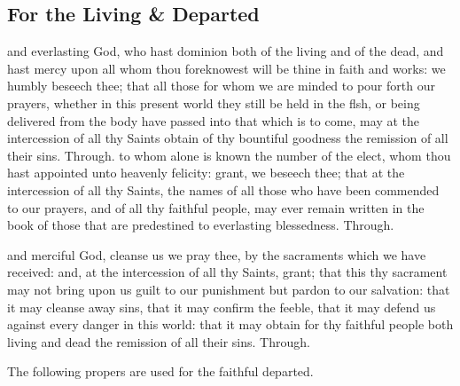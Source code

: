 \begin{multicols}{2}
\subsection{For the Living \& Departed}
\collect
{} and everlasting God, who hast dominion both of the living and of the dead, and hast mercy upon all whom thou foreknowest will be thine in faith and works: we humbly beseech thee; that all those for whom we are minded to pour forth our prayers, whether in this present world they still be held in the flsh, or being delivered from the body have passed into that which is to come, may at the intercession of all thy Saints obtain of thy bountiful goodness the remission of all their sins. Through.
\secret
{} to whom alone is known the number of the elect, whom thou hast appointed unto heavenly felicity: grant, we beseech thee; that at the intercession of all thy Saints, the names of all those who have been commended to our prayers, and of all thy faithful people, may ever remain written in the book of those that are predestined to everlasting blessedness. Through.

   \newcolumn

\postcommunion
{} and merciful God, cleanse us we pray thee, by the sacraments which we have received: and, at the intercession of all thy Saints, grant; that this thy sacrament may not bring upon us guilt to our punishment but pardon to our salvation: that it may cleanse away sins, that it may confirm the feeble, that it may defend us against every danger in this world: that it may obtain for thy
faithful people both living and dead the remission of all their sins. Through.
\end{multicols}

\begin{rubric}
    The following propers are used for the faithful departed.
\end{rubric}

